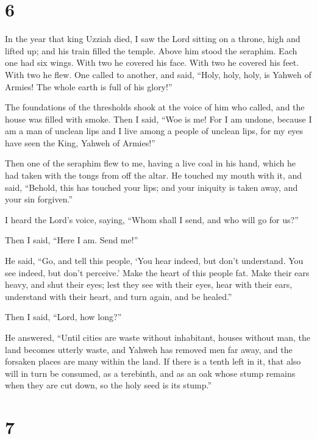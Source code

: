 \hypertarget{section-5}{%
\section{6}\label{section-5}}

 In the year that king Uzziah died, I saw the Lord sitting
on a throne, high and lifted up; and his train filled the temple.
 Above him stood the seraphim. Each one had six wings.
With two he covered his face. With two he covered his feet. With two he
flew.  One called to another, and said, ``Holy, holy,
holy, is Yahweh of Armies! The whole earth is full of his glory!''

 The foundations of the thresholds shook at the voice of
him who called, and the house was filled with smoke.  Then
I said, ``Woe is me! For I am undone, because I am a man of unclean lips
and I live among a people of unclean lips, for my eyes have seen the
King, Yahweh of Armies!''

 Then one of the seraphim flew to me, having a live coal
in his hand, which he had taken with the tongs from off the altar.
 He touched my mouth with it, and said, ``Behold, this has
touched your lips; and your iniquity is taken away, and your sin
forgiven.''

 I heard the Lord's voice, saying, ``Whom shall I send,
and who will go for us?''

Then I said, ``Here I am. Send me!''

 He said, ``Go, and tell this people, `You hear indeed,
but don't understand. You see indeed, but don't perceive.'
 Make the heart of this people fat. Make their ears
heavy, and shut their eyes; lest they see with their eyes, hear with
their ears, understand with their heart, and turn again, and be
healed.''

 Then I said, ``Lord, how long?''

He answered, ``Until cities are waste without inhabitant, houses without
man, the land becomes utterly waste,  and Yahweh has
removed men far away, and the forsaken places are many within the land.
 If there is a tenth left in it, that also will in turn
be consumed, as a terebinth, and as an oak whose stump remains when they
are cut down, so the holy seed is its stump.''

\hypertarget{section-6}{%
\section{7}\label{section-6}}

